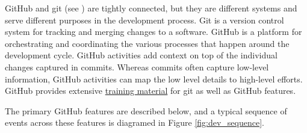 \documentclass[]{nrel}
\begin{document}
GitHub and git (see ) are tightly connected, but they are different
systems and serve different purposes in the development process.
Git is a version control system for tracking and merging changes to a software.
GitHub is a platform for orchestrating and coordinating the various processes that happen
around the development cycle.
GitHub activities add context on top of the individual changes captured in commits.
Whereas commits often capture low-level information, GitHub activities can map the low level
details to high-level efforts.
GitHub provides extensive \href{https://docs.github.com/en/get-started/quickstart/git-and-github-learning-resources}{training material}
for git as well as GitHub features.

The primary GitHub features are described below, and a typical sequence of events across these
features is diagramed in Figure \ref{fig:dev_sequence}.
\end{document}
